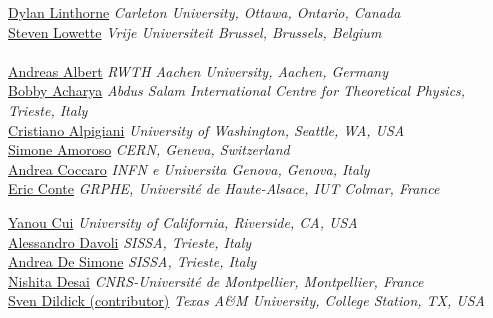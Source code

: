 \noindent\href{mailto:dylan.linthorne@cmail.ca}{Dylan Linthorne}
\emph{Carleton University, Ottawa, Ontario, Canada}\\

\noindent\href{mailto:steven.lowette@cern.ch}{Steven Lowette}
\emph{Vrije Universiteit Brussel, Brussels, Belgium}\\

\text{ \; }\\

\noindent\href{mailto:albert@physik.rwth-aachen.de}{Andreas Albert}
\emph{RWTH Aachen University, Aachen, Germany}\\

\noindent\href{mailto:bobby.samir.acharya@cern.ch}{Bobby Acharya}
\emph{Abdus Salam International Centre for Theoretical Physics, Trieste, Italy}\\

\noindent\href{mailto:cristiano.alpigiani@cern.ch}{Cristiano Alpigiani}
\emph{University of Washington, Seattle, WA, USA}\\

\noindent\href{mailto:simone.amoroso@cern.ch}{Simone Amoroso}
\emph{CERN, Geneva, Switzerland}\\

\noindent\href{mailto:andrea.coccaro@cern.ch}{Andrea Coccaro}
\emph{INFN e Universita Genova, Genova, Italy}\\

\noindent\href{mailto:eric.conte@iphc.cnrs.fr}{Eric Conte}
\emph{GRPHE, Universit\'{e} de Haute-Alsace, IUT Colmar, France}

\noindent\href{mailto:yanou.cui@ucr.edu}{Yanou Cui} 
\emph{University of California, Riverside, CA, USA}\\

\noindent\href{mailto:alessandro.davoli@sissa.it}{Alessandro Davoli} 
\emph{SISSA, Trieste, Italy}\\

\noindent\href{mailto:andrea.desimone@sissa.it}{Andrea De Simone} 
\emph{SISSA, Trieste, Italy}\\

\noindent\href{mailto:nishita.desai@umontpellier.fr}{Nishita Desai}
\emph{CNRS-Universit\'e de Montpellier, Montpellier, France}\\

\noindent\href{mailto:sven.dildick@cern.ch}{Sven Dildick (contributor)}
\emph{Texas A\&M University, College Station, TX, USA}\\

